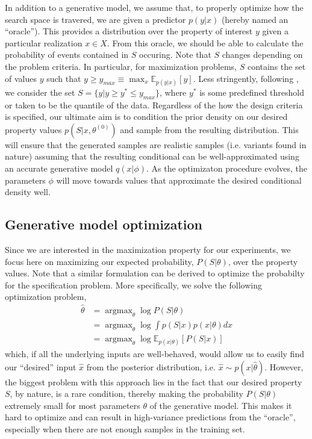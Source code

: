 \documentclass{article}
\DeclareMathOperator*{\argmax}{argmax}
\begin{document}
In addition to a generative model, we assume that, to properly optimize how the
search space is travered, we are given a predictor $p(y|x)$ (hereby named an
``oracle''). This provides a distribution over the property of interest $y$
given a particular realization $x \in X$. From this oracle, we should be able to
calculate the probability of events contained in $S$ occuring. Note that $S$
changes depending on the problem criteria. In particular, for maximization
problems, $S$ contains the set of values $y$ such that $y \geq y_{max} \equiv
\max_{x} \mathbb{E}_{p(y|x)}[y]$. Less stringently, following
\cite{brookes2019conditioning}, we consider the set $S = \{y | y \geq y^* \leq
y_{max} \}$, where $y^*$ is some predefined threshold or taken to be the
quantile of the data. Regardless of the how the design criteria is specified,
our ultimate aim is to condition the prior density on our desired property
values $p(S|x,\theta^{(0)})$ and sample from the resulting distribution. This
will ensure that the generated samples are realistic samples (i.e. variants
found in nature) assuming that the resulting conditional can be
well-approximated using an accurate generative model $q(x|\phi)$. As the
optimizaton procedure evolves, the parameters $\phi$ will move towards values
that approximate the desired conditional density well.


\subsection{Generative model optimization}
\label{sec:methods-generative_model_optimization}
Since we are interested in the maximization property for our experiments, we
focus here on maximizing our expected probability, $P(S|\theta)$, over the
property values. Note that a similar formulation can be derived to optimize the
probabilty for the specification problem. More specifically, we solve the
following optimization problem,
%
\begin{align}
  \hat{\theta}
    &= \argmax_{\theta} \log P(S|\theta) \\
    &= \argmax_{\theta} \log \int p(S|x) p(x|\theta) dx \\
    &= \argmax_{\theta} \log \mathbb{E}_{p(x|\theta)} [P(S|x)] \label{eq:basic_opt}
\end{align}
%
which, if all the underlying inputs are well-behaved, would allow us to easily
find our ``desired'' input $\hat{x}$ from the posterior distribution, i.e.
$\hat{x} \sim p(x|\hat{\theta})$. However, the biggest problem with this
approach lies in the fact that our desired property $S$, by nature, is a rare
condition, thereby making the probability $P(S|\theta)$ extremely small for most
parameters $\theta$ of the generative model. This makes it hard to optimize and
can result in high-variance predictions from the ``oracle'', especially when
there are not enough samples in the training set.
\end{document}
